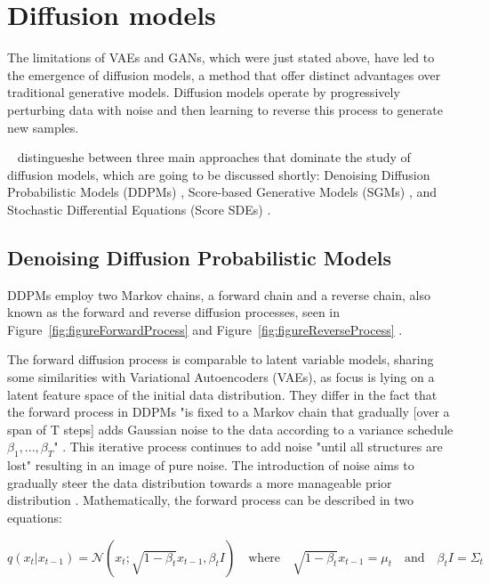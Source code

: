 \section{Diffusion models}
\label{diffusion Models}

The limitations of VAEs and GANs, which were just stated above, have led to the emergence of diffusion models, a method that offer distinct advantages over traditional generative models. Diffusion models operate by progressively perturbing data with noise and then learning to reverse this process to generate new samples. 

~\cite{yangdiffusionSummary} distingueshe between three main approaches that dominate the study of diffusion models, which are going to be discussed shortly: Denoising Diffusion Probabilistic Models (DDPMs) \citep{hoDDPMs,sohlDDPM}, Score-based Generative Models (SGMs) \citep{song2019SGM}, and Stochastic Differential Equations (Score SDEs) \citep{song2020score, song2021maximum}.

\subsection{Denoising Diffusion Probabilistic Models}
DDPMs employ two Markov chains, a forward chain and a reverse chain, also known as the forward and reverse diffusion processes, seen in Figure~\ref{fig:figureForwardProcess} and Figure~\ref{fig:figureReverseProcess} \citep{sohlDDPM}. 

The forward diffusion process is comparable to latent variable models, sharing some similarities with Variational Autoencoders (VAEs), as focus is lying on a latent feature space of the initial data distribution. They differ in the fact that the forward process in DDPMs "is fixed to a Markov chain that gradually [over a span of T steps] adds Gaussian noise to the data according to a variance schedule \(\beta_1, ..., \beta_T \)" \cite{hoDDPMs}. This iterative process continues to add noise "until all structures are lost" \citep{yangdiffusionSummary} resulting in an image of pure noise. The introduction of noise aims to gradually steer the data distribution towards a more manageable prior distribution \citep{yangdiffusionSummary, pooleDreamfusion}. Mathematically, the forward process can be described in two equations:

\[
q(x_t | x_{t-1}) = \mathcal{N}(x_t; \sqrt{1 - \beta_t}x_{t-1}, \beta_t I) \quad \text{where} \quad \sqrt{1 - \beta_t}x_{t-1} = \mu_t \quad \text{and} \quad \beta_t I = \Sigma_t
\] 

